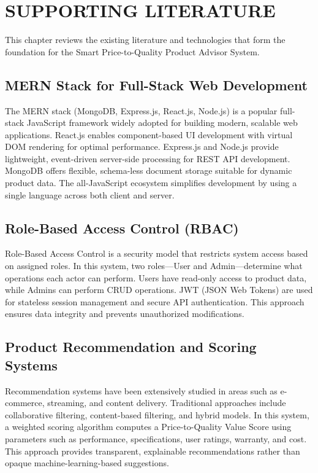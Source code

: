 \chapter{SUPPORTING LITERATURE}

This chapter reviews the existing literature and technologies that form the foundation for the Smart Price-to-Quality Product Advisor System.

\section{MERN Stack for Full-Stack Web Development}
The MERN stack (MongoDB, Express.js, React.js, Node.js) is a popular full-stack JavaScript framework widely adopted for building modern, scalable web applications. React.js enables component-based UI development with virtual DOM rendering for optimal performance. Express.js and Node.js provide lightweight, event-driven server-side processing for REST API development. MongoDB offers flexible, schema-less document storage suitable for dynamic product data. The all-JavaScript ecosystem simplifies development by using a single language across both client and server.

\section{Role-Based Access Control (RBAC)}
Role-Based Access Control is a security model that restricts system access based on assigned roles. In this system, two roles—User and Admin—determine what operations each actor can perform. Users have read-only access to product data, while Admins can perform CRUD operations. JWT (JSON Web Tokens) are used for stateless session management and secure API authentication. This approach ensures data integrity and prevents unauthorized modifications.

\section{Product Recommendation and Scoring Systems}
Recommendation systems have been extensively studied in areas such as e-commerce, streaming, and content delivery. Traditional approaches include collaborative filtering, content-based filtering, and hybrid models. In this system, a weighted scoring algorithm computes a Price-to-Quality Value Score using parameters such as performance, specifications, user ratings, warranty, and cost. This approach provides transparent, explainable recommendations rather than opaque machine-learning-based suggestions.

